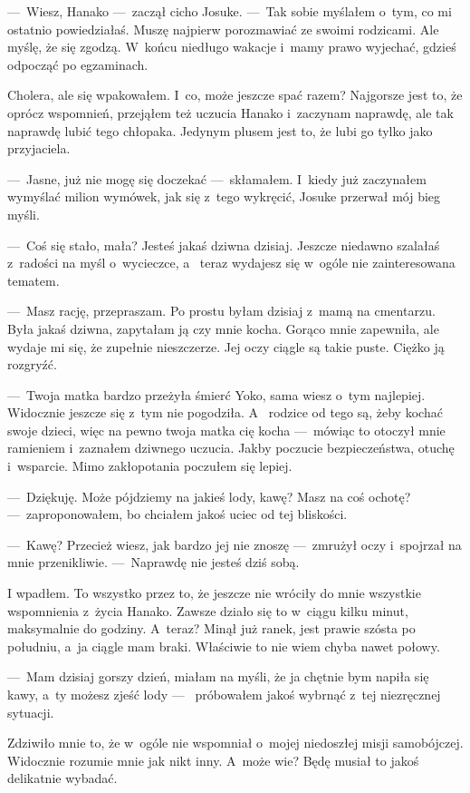 ---~Wiesz, Hanako ---~zaczął cicho Josuke. ---~Tak sobie myślałem o~tym, co mi ostatnio powiedziałaś. Muszę najpierw 
porozmawiać ze swoimi rodzicami. Ale myślę, że się zgodzą. W~końcu niedługo wakacje i~mamy prawo wyjechać, gdzieś 
odpocząć po egzaminach. 

Cholera, ale się wpakowałem. I~co, może jeszcze spać razem? Najgorsze jest to, że oprócz wspomnień, przejąłem też 
uczucia Hanako i~zaczynam naprawdę, ale tak naprawdę lubić tego chłopaka. Jedynym plusem jest to, że lubi go tylko 
jako przyjaciela. 

---~Jasne, już nie mogę się doczekać ---~skłamałem. I~kiedy już zaczynałem wymyślać milion wymówek, jak się z~tego 
wykręcić, Josuke przerwał mój bieg myśli.

---~Coś się stało, mała? Jesteś jakaś dziwna dzisiaj. Jeszcze niedawno szalałaś z~radości na myśl o~wycieczce, a~
teraz wydajesz się w~ogóle nie zainteresowana tematem.

---~Masz rację, przepraszam. Po prostu  byłam dzisiaj z~mamą na cmentarzu. Była jakaś dziwna, zapytałam ją czy mnie 
kocha. Gorąco mnie zapewniła, ale wydaje mi się, że zupełnie nieszczerze. Jej oczy ciągle są takie puste. Ciężko ją 
rozgryźć.

---~Twoja matka bardzo przeżyła śmierć Yoko, sama wiesz o~tym najlepiej. Widocznie jeszcze się z~tym nie pogodziła. A~
rodzice od tego są, żeby kochać swoje dzieci, więc na pewno twoja matka cię kocha ---~mówiąc to otoczył mnie 
ramieniem i~zaznałem dziwnego uczucia. Jakby poczucie bezpieczeństwa, otuchę i~wsparcie. Mimo zakłopotania poczułem 
się lepiej. 

---~Dziękuję. Może pójdziemy na jakieś lody, kawę? Masz na coś ochotę? ---~zaproponowałem, bo chciałem jakoś uciec od 
tej bliskości.

---~Kawę? Przecież wiesz, jak bardzo jej nie znoszę ---~zmrużył oczy i~spojrzał na mnie przenikliwie. ---~Naprawdę 
nie jesteś dziś sobą.

I wpadłem. To wszystko przez to, że jeszcze nie wróciły do mnie wszystkie wspomnienia z~życia Hanako. Zawsze działo 
się to w~ciągu kilku minut, maksymalnie do godziny. A~teraz? Minął już ranek, jest prawie szósta po południu, a~ja 
ciągle mam braki. Właściwie to nie wiem chyba nawet połowy. 

---~Mam dzisiaj gorszy dzień, miałam na myśli, że ja chętnie bym napiła się kawy, a~ty możesz zjeść lody ---~
próbowałem jakoś wybrnąć z~tej niezręcznej sytuacji.

Zdziwiło mnie to, że w~ogóle nie wspomniał o~mojej niedoszłej misji samobójczej. Widocznie rozumie mnie jak nikt 
inny. A~może wie? Będę musiał to jakoś delikatnie wybadać.

